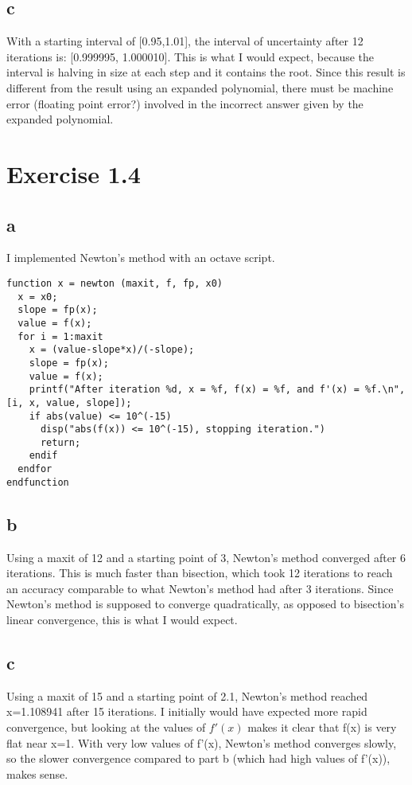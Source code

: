\documentclass[11pt]{amsart}
\begin{document}
 \subsection{c}
   With a starting interval of [0.95,1.01], the interval of uncertainty after 12 iterations is: [0.999995, 1.000010].  This is what I would expect, because the interval is halving in size at each step and it contains the root.  Since this result is different from the result using an expanded polynomial, there must be machine error (floating point error?) involved in the incorrect answer given by the expanded polynomial.
   \newpage
   \section{Exercise 1.4}
   \subsection{a}
   I implemented Newton's method with an octave script.\\
   \begin{verbatim}
function x = newton (maxit, f, fp, x0)
  x = x0;
  slope = fp(x);
  value = f(x);
  for i = 1:maxit
    x = (value-slope*x)/(-slope);
    slope = fp(x);
    value = f(x);
    printf("After iteration %d, x = %f, f(x) = %f, and f'(x) = %f.\n", [i, x, value, slope]);
    if abs(value) <= 10^(-15)
      disp("abs(f(x)) <= 10^(-15), stopping iteration.")
      return;
    endif
  endfor
endfunction
   \end{verbatim}
   \subsection{b}
   Using a maxit of 12 and a starting point of 3, Newton's method converged after 6 iterations.  This is much faster than bisection, which took 12 iterations to reach an accuracy comparable to what Newton's method had after 3 iterations.  Since Newton's method is supposed to converge quadratically, as opposed to bisection's linear convergence, this is what I would expect.
   \subsection{c}
   Using a maxit of 15 and a starting point of 2.1, Newton's method reached x=1.108941 after 15 iterations.  I initially would have expected more rapid convergence, but looking at the values of $f'(x)$ makes it clear that f(x) is very flat near x=1.  With very low values of f'(x), Newton's method converges slowly, so the slower convergence compared to part b (which had high values of f'(x)), makes sense. 
\newpage
\end{document}
